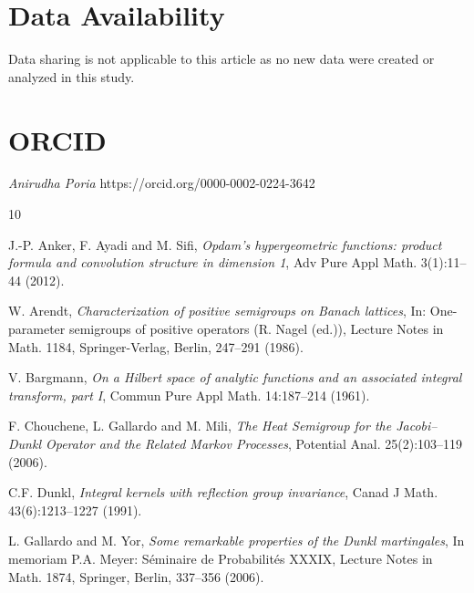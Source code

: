 \documentclass[a4paper,11pt, reqno]{amsart}
\theoremstyle{plain}
\theoremstyle{definition}
\theoremstyle{remark}
\begin{document}
\section*{Data Availability}
Data sharing is not applicable to this article as no new data were created or analyzed in this study.

\section*{ORCID}
{\it Anirudha Poria} https://orcid.org/0000-0002-0224-3642

 
\begin{thebibliography}{10}

J.-P. Anker, F. Ayadi and M. Sifi, {\it Opdam's hypergeometric functions: product formula and convolution structure in dimension 1}, Adv Pure Appl Math. 3(1):11--44 (2012).

W. Arendt, {\it Characterization of positive semigroups on Banach lattices}, In: One-parameter semigroups of positive operators (R. Nagel (ed.)), Lecture Notes in Math. 1184, Springer-Verlag, Berlin, 247--291 (1986).

V. Bargmann, {\it On a Hilbert space of analytic functions and an associated integral transform, part I}, Commun Pure Appl Math. 14:187--214 (1961).

F. Chouchene, L. Gallardo and M. Mili, {\it The Heat Semigroup for the Jacobi–Dunkl Operator and the Related Markov Processes}, Potential Anal. 25(2):103--119 (2006).


C.F. Dunkl, {\it Integral kernels with reflection group invariance}, Canad J Math. 43(6):1213--1227 (1991).


L. Gallardo and M. Yor, {\it Some remarkable properties of the Dunkl martingales}, In memoriam P.A. Meyer: S\'eminaire de Probabilit\'es XXXIX, Lecture Notes in Math. 1874, Springer, Berlin, 337--356 (2006).



\end{thebibliography}
\end{document}
